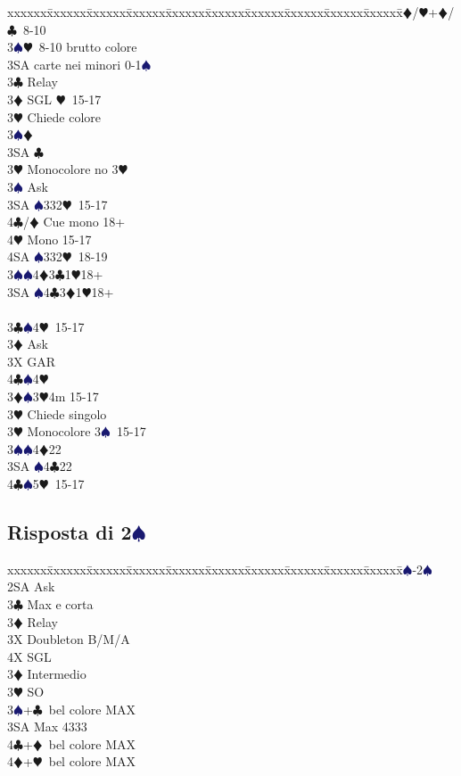 \documentclass[a4paper,italian]{article}
\newcommand{\BC}{\textcolor{OliveGreen}{$\clubsuit$}}
\newcommand{\BD}{\textcolor{RedOrange}{$\vardiamondsuit$}}
\newcommand{\BH}{\textcolor{Red2}{$\varheartsuit${}}}
\newcommand{\BS}{\textcolor{MidnightBlue}{$\spadesuit${}}}
\newcommand{\pdfs}{\texorpdfstring{\BS{}}{S}}
\newenvironment{bidtable}
{\begin{tabbing}

    xxxxxx\=xxxxxx\=xxxxxx\=xxxxxx\=xxxxxx\=xxxxxx\=xxxxxx\=xxxxxx\=xxxxxx\=xxxxxx\=\kill}
{\end{tabbing} }%
\begin{document}
\begin{multicols}{2}
\begin{bidtable}
        3\BD/\BH {}+\BD /\BC\ 8-10\\
        3\BS {}\BH\ 8-10 brutto colore\\
        3SA  carte nei minori 0-1\BS \\
        3\BC \> Relay\+\\
        3\BD \> SGL \BH\ 15-17\+\\
        3\BH \> Chiede colore\+\\
        3\BS {}\BD \\
        3SA \BC \-\-\\
        3\BH \> Monocolore no 3\BH \+\\
        3\BS \> Ask\+\\
        3SA \BS 332\BH\ 15-17\\
        4\BC/\BD \> Cue mono 18+\\
        4\BH \> Mono 15-17\\
        4SA \BS 332\BH\ 18-19\-\-\\
        3\BS {}\BS4\BD3\BC1\BH 18+\\
        3SA \BS4\BC3\BD1\BH 18+\-\-\\
        \\
        3\BC {}\BS 4\BH\ 15-17\+\\
        3\BD \> Ask\+\\
        3X \> GAR\\
        4\BC {}\BS 4\BH \-\-\\
        3\BD {}\BS 3\BH 4m 15-17\+\\
        3\BH \> Chiede singolo\-\\
        3\BH \> Monocolore 3\BS\ 15-17\\
        3\BS {}\BS 4\BD 22\\
        3SA \BS 4\BC 22\\
        4\BC {}\BS 5\BH\ 15-17\\
    \end{bidtable}

    \subsection{Risposta di 2\pdfs}

    \begin{bidtable}
        1\BS-2\BS\+\\
        2SA \> Ask\+\\
        3\BC \> Max e corta\+\\
        3\BD \> Relay\+\\
        3X \> Doubleton B/M/A\\
        4X \> SGL\-\-\\
        3\BD \> Intermedio\\
        3\BH \> SO\\
        3\BS {}+\BC\ bel colore MAX\\
        3SA \> Max 4333\\
        4\BC {}+\BD\ bel colore MAX\\
        4\BD {}+\BH\ bel colore MAX\-\-
    \end{bidtable}
    \columnbreak


\end{multicols}
\end{document}
